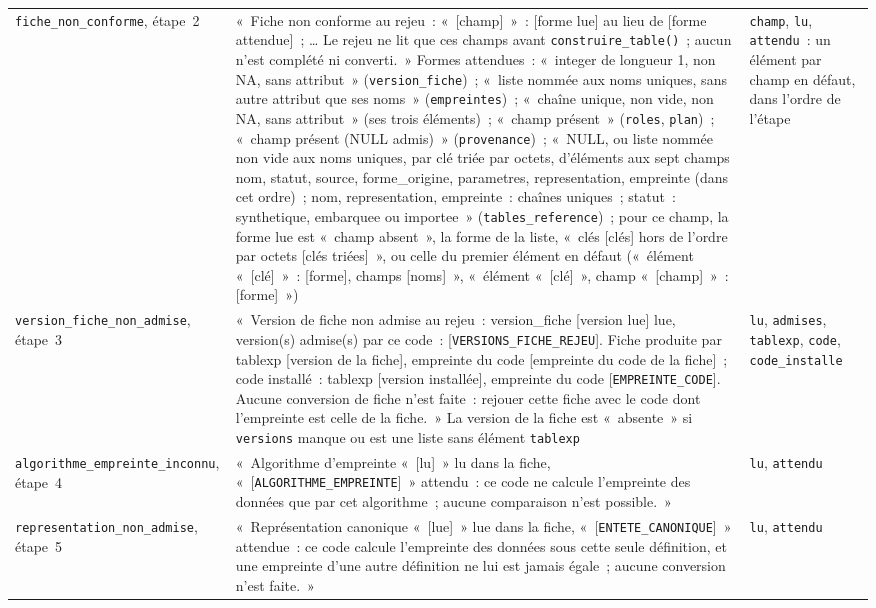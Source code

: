 \documentclass[a4paper,11pt]{article}
\newcommand{\code}[1]{\texttt{\small #1}}
\begin{document}
{\begin{longtable}{@{}p{5.5cm}p{6.7cm}p{2.4cm}@{}}
\code{fiche\_non\_conforme}, étape~2 & «~Fiche non conforme au rejeu~: «~[champ]~»~: [forme lue] au lieu de [forme attendue]~; \ldots{} Le rejeu ne lit que ces champs avant \code{construire\_table()}~; aucun n'est complété ni converti.~» Formes attendues~: «~integer de longueur 1, non NA, sans attribut~» (\code{version\_fiche})~; «~liste nommée aux noms uniques, sans autre attribut que ses noms~» (\code{empreintes})~; «~chaîne unique, non vide, non NA, sans attribut~» (ses trois éléments)~; «~champ présent~» (\code{roles}, \code{plan})~; «~champ présent (NULL admis)~» (\code{provenance})~; «~NULL, ou liste nommée non vide aux noms uniques, par clé triée par octets, d'éléments aux sept champs nom, statut, source, forme\_origine, parametres, representation, empreinte (dans cet ordre)~; nom, representation, empreinte~: chaînes uniques~; statut~: synthetique, embarquee ou importee~» (\code{tables\_reference})~; pour ce champ, la forme lue est «~champ absent~», la forme de la liste, «~clés [clés] hors de l'ordre par octets [clés triées]~», ou celle du premier élément en défaut («~élément «~[clé]~»~: [forme], champs [noms]~», «~élément «~[clé]~», champ «~[champ]~»~: [forme]~») & \code{champ}, \code{lu}, \code{attendu}~: un élément par champ en défaut, dans l'ordre de l'étape \\
\code{version\_fiche\_non\_admise}, étape~3 & «~Version de fiche non admise au rejeu~: version\_fiche [version lue] lue, version(s) admise(s) par ce code~: [\code{VERSIONS\_FICHE\_REJEU}]. Fiche produite par tablexp [version de la fiche], empreinte du code [empreinte du code de la fiche]~; code installé~: tablexp [version installée], empreinte du code [\code{EMPREINTE\_CODE}]. Aucune conversion de fiche n'est faite~: rejouer cette fiche avec le code dont l'empreinte est celle de la fiche.~» La version de la fiche est «~absente~» si \code{versions} manque ou est une liste sans élément \code{tablexp} & \code{lu}, \code{admises}, \code{tablexp}, \code{code}, \code{code\_installe} \\
\code{algorithme\_empreinte\_inconnu}, étape~4 & «~Algorithme d'empreinte «~[lu]~» lu dans la fiche, «~[\code{ALGORITHME\_EMPREINTE}]~» attendu~: ce code ne calcule l'empreinte des données que par cet algorithme~; aucune comparaison n'est possible.~» & \code{lu}, \code{attendu} \\
\code{representation\_non\_admise}, étape~5 & «~Représentation canonique «~[lue]~» lue dans la fiche, «~[\code{ENTETE\_CANONIQUE}]~» attendue~: ce code calcule l'empreinte des données sous cette seule définition, et une empreinte d'une autre définition ne lui est jamais égale~; aucune conversion n'est faite.~» & \code{lu}, \code{attendu} \\

\end{longtable}}
\end{document}
